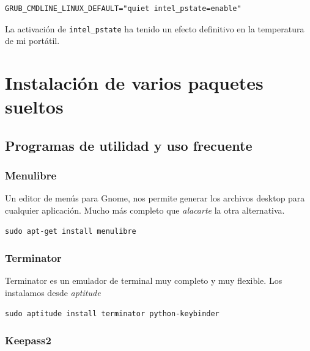 \documentclass[12pt,spanish,]{scrartcl}
\begin{document}
\begin{verbatim}
GRUB_CMDLINE_LINUX_DEFAULT="quiet intel_pstate=enable"
\end{verbatim}

La activación de \texttt{intel\_pstate} ha tenido un efecto definitivo
en la temperatura de mi portátil.

\hypertarget{instalaciuxf3n-de-varios-paquetes-sueltos}{%
\section{Instalación de varios paquetes
sueltos}\label{instalaciuxf3n-de-varios-paquetes-sueltos}}

\hypertarget{programas-de-utilidad-y-uso-frecuente}{%
\subsection{Programas de utilidad y uso
frecuente}\label{programas-de-utilidad-y-uso-frecuente}}

\hypertarget{menulibre}{%
\subsubsection{Menulibre}\label{menulibre}}

Un editor de menús para Gnome, nos permite generar los archivos desktop
para cualquier aplicación. Mucho más completo que \emph{alacarte} la
otra alternativa.

\begin{verbatim}
sudo apt-get install menulibre
\end{verbatim}

\hypertarget{terminator}{%
\subsubsection{Terminator}\label{terminator}}

Terminator es un emulador de terminal muy completo y muy flexible. Los
instalamos desde \emph{aptitude}

\begin{verbatim}
sudo aptitude install terminator python-keybinder
\end{verbatim}

\hypertarget{keepass2}{%
\subsubsection{Keepass2}\label{keepass2}}
\end{document}
